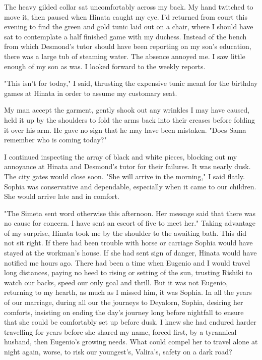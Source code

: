 \documentclass{article}
\begin{document}
The heavy gilded collar sat uncomfortably across my back. My hand twitched to move it, then paused when Hinata caught my eye. I'd returned from court this evening to find the green and gold tunic laid out on a chair, where I should have sat to contemplate a half finished game with my duchess. Instead of the bench from which Desmond's tutor should have been reporting on my son's education, there was a large tub of steaming water. The absence annoyed me. I saw little enough of my son as was. I looked forward to the weekly reports.

"This isn't for today," I said, thrusting the expensive tunic meant for the birthday games at Hinata in order to assume my customary seat.

My man accept the garment, gently shook out any wrinkles I may have caused, held it up by the shoulders to fold the arms back into their creases before folding it over his arm. He gave no sign that he may have been mistaken. "Does Sama remember who is coming today?"

I continued inspecting the array of black and white pieces, blocking out my annoyance at Hinata and Desmond's tutor for their failures. It was nearly dusk. The city gates would close soon. "She will arrive in the morning," I said flatly. Sophia was conservative and dependable, especially when it came to our children. She would arrive late and in comfort.

"The Simeta sent word otherwise this afternoon. Her message said that there was no cause for concern. I have sent an escort of five to meet her." Taking advantage of my surprise, Hinata took me by the shoulder to the awaiting bath. This did not sit right. If there had been trouble with horse or carriage Sophia would have stayed at the workman's house. If she had sent sign of danger, Hinata would have notified me hours ago. There had been a time when Eugenio and I would travel long distances, paying no heed to rising or setting of the sun, trusting Rishiki to watch our backs, speed our only goal and thrill. But it was not Eugenio, returning to my hearth, as much as I missed him, it was Sophia. In all the years of our marriage, during all our the journeys to Deyalorn, Sophia, desiring her comforts, insisting on ending the day's journey long before nightfall to ensure that she could be comfortably set up before dusk. I knew she had endured harder travelling for years before she shared my name, forced first, by a tyrannical husband, then Eugenio's growing needs. What could compel her to travel alone at night again, worse, to risk our youngest's, Valira's, safety on a dark road?
\end{document}
